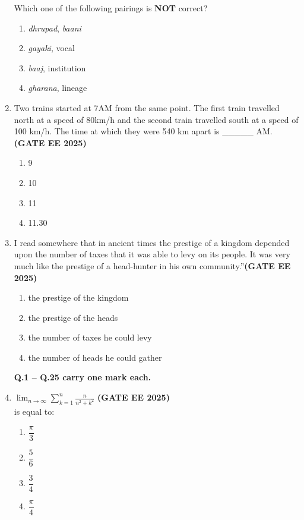 \documentclass[journal,12pt,onecolumn]{IEEEtran}
\theoremstyle{remark}
\begin{document}
\begin{enumerate}
Which one of the following pairings is \textbf{NOT} correct?

\begin{enumerate} 
    \item \textit{dhrupad}, \textit{baani}
    \item \textit{gayaki}, vocal
    \item \textit{baaj}, institution
    \item \textit{gharana}, lineage
\end{enumerate}


\item Two trains started at 7AM from the same point. The first train travelled north at a speed of 80km/h and the second train travelled south at a speed of 100 km/h. The time at which they were 540 km apart is \_\_\_\_\_ AM.\hfill \textbf{(GATE EE 2025)}\\

\begin{enumerate} 
    \item 9
    \item 10
    \item 11
    \item 11.30
\end{enumerate}

\item I read somewhere that in ancient times the prestige of a kingdom depended upon the number of taxes that it was able to levy on its people. It was very much like the prestige of a head-hunter in his own community.''\hfill \textbf{(GATE EE 2025)}\\


\begin{enumerate} 
    \item the prestige of the kingdom
    \item the prestige of the heads
    \item the number of taxes he could levy
    \item the number of heads he could gather
\end{enumerate}
\begin{center}
    \Large \textbf{Q.1 -- Q.25 carry one mark each.}
\end{center}

\item $\lim_{n \to \infty} \sum_{k=1}^n \frac{n}{n^2 + k^2}$ \hfill \textbf{(GATE EE 2025)}\\
is equal to:
\begin{enumerate} 
    \item $\dfrac{\pi}{3}$
    \item $\dfrac{5}{6}$
    \item $\dfrac{3}{4}$
    \item $\dfrac{\pi}{4}$
\end{enumerate}



\end{enumerate}
\end{document}
